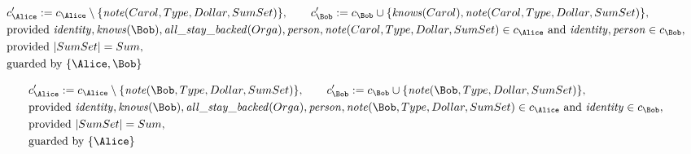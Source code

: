 \begin{align*}
&
c'_
{
\Alice
}
 := 
c_
{
\Alice
}
 \setminus 
\{
\mathit{\detokenize{
note
}}
(
Carol
,
Type
,
Dollar
,
SumSet
)
\}
, \qquad 
c'_
{
\Bob
}
 := 
c_
{
\Bob
}
 \cup 
\{
\mathit{\detokenize{
knows
}}
(
Carol
)
,
\mathit{\detokenize{
note
}}
(
Carol
,
Type
,
Dollar
,
SumSet
)
\}
,\\
&
\text{provided } 
\mathit{\detokenize{
identity
}}
,
\mathit{\detokenize{
knows
}}
(
\Bob
)
,
\mathit{\detokenize{
all_stay_backed
}}
(
Orga
)
,
\mathit{\detokenize{
person
}}
,
\mathit{\detokenize{
note
}}
(
Carol
,
Type
,
Dollar
,
SumSet
)
 \in c_
{
\Alice
}
 \text{ and } 
\mathit{\detokenize{
identity
}}
,
\mathit{\detokenize{
person
}}
 \in c_
{
\Bob
}
,\\
&
\text{provided } 
|
SumSet
|
=
Sum
,\\
&
\text{guarded by } \{
\Alice
,
\Bob
\}
\end{align*}

\begin{align*}
&
c'_
{
\Alice
}
 := 
c_
{
\Alice
}
 \setminus 
\{
\mathit{\detokenize{
note
}}
(
\Bob
,
Type
,
Dollar
,
SumSet
)
\}
, \qquad 
c'_
{
\Bob
}
 := 
c_
{
\Bob
}
 \cup 
\{
\mathit{\detokenize{
note
}}
(
\Bob
,
Type
,
Dollar
,
SumSet
)
\}
,\\
&
\text{provided } 
\mathit{\detokenize{
identity
}}
,
\mathit{\detokenize{
knows
}}
(
\Bob
)
,
\mathit{\detokenize{
all_stay_backed
}}
(
Orga
)
,
\mathit{\detokenize{
person
}}
,
\mathit{\detokenize{
note
}}
(
\Bob
,
Type
,
Dollar
,
SumSet
)
 \in c_
{
\Alice
}
 \text{ and } 
\mathit{\detokenize{
identity
}}
 \in c_
{
\Bob
}
,\\
&
\text{provided } 
|
SumSet
|
=
Sum
,\\
&
\text{guarded by } \{
\Alice
\}
\end{align*}

